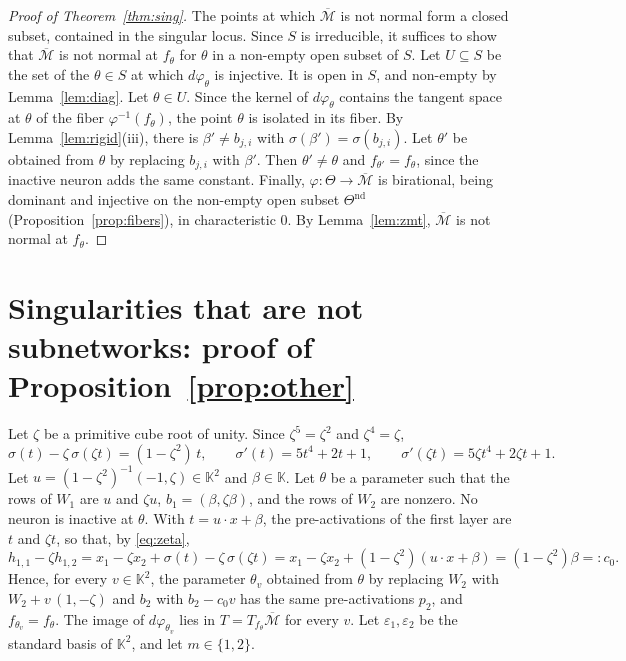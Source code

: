 \documentclass[11pt]{article}
\theoremstyle{definition}
\theoremstyle{remark}
\newcommand{\K}{\mathbb{K}}
\newcommand{\M}{\mathcal{M}}
\newcommand{\Mbar}{\overline{\M}}
\newcommand{\Tn}{\Theta^{\mathrm{nd}}}
\begin{document}
\begin{proof}[Proof of Theorem~\ref{thm:sing}]
The points at which $\Mbar$ is not normal form a closed subset, contained in the singular locus. Since $S$ is irreducible, it suffices to show that $\Mbar$ is not normal at $f_\theta$ for $\theta$ in a non-empty open subset of $S$. Let $U\subseteq S$ be the set of the $\theta\in S$ at which $d\varphi_\theta$ is injective. It is open in $S$, and non-empty by Lemma~\ref{lem:diag}. Let $\theta\in U$. Since the kernel of $d\varphi_\theta$ contains the tangent space at $\theta$ of the fiber $\varphi^{-1}(f_\theta)$, the point $\theta$ is isolated in its fiber. By Lemma~\ref{lem:rigid}(iii), there is $\beta'\ne b_{j,i}$ with $\sigma(\beta')=\sigma(b_{j,i})$. Let $\theta'$ be obtained from $\theta$ by replacing $b_{j,i}$ with $\beta'$. Then $\theta'\ne\theta$ and $f_{\theta'}=f_\theta$, since the inactive neuron adds the same constant. Finally, $\varphi\colon\Theta\to\Mbar$ is birational, being dominant and injective on the non-empty open subset $\Tn$ (Proposition~\ref{prop:fibers}), in characteristic $0$. By Lemma~\ref{lem:zmt}, $\Mbar$ is not normal at $f_\theta$.
\end{proof}

\section{Singularities that are not subnetworks: proof of Proposition~\ref{prop:other}}

Let $\zeta$ be a primitive cube root of unity. Since $\zeta^5=\zeta^2$ and $\zeta^4=\zeta$,
\begin{equation}\label{eq:zeta}
\sigma(t)-\zeta\,\sigma(\zeta t)=(1-\zeta^2)\,t,\qquad\sigma'(t)=5t^4+2t+1,\qquad\sigma'(\zeta t)=5\zeta t^4+2\zeta t+1.
\end{equation}
Let $u=(1-\zeta^2)^{-1}(-1,\zeta)\in\K^2$ and $\beta\in\K$. Let $\theta$ be a parameter such that the rows of $W_1$ are $u$ and $\zeta u$, $b_1=(\beta,\zeta\beta)$, and the rows of $W_2$ are nonzero. No neuron is inactive at $\theta$. With $t=u\cdot x+\beta$, the pre-activations of the first layer are $t$ and $\zeta t$, so that, by \eqref{eq:zeta},
\[
h_{1,1}-\zeta h_{1,2}=x_1-\zeta x_2+\sigma(t)-\zeta\,\sigma(\zeta t)=x_1-\zeta x_2+(1-\zeta^2)(u\cdot x+\beta)=(1-\zeta^2)\beta=:c_0.
\]
Hence, for every $v\in\K^2$, the parameter $\theta_v$ obtained from $\theta$ by replacing $W_2$ with $W_2+v\,(1,-\zeta)$ and $b_2$ with $b_2-c_0v$ has the same pre-activations $p_2$, and $f_{\theta_v}=f_\theta$. The image of $d\varphi_{\theta_v}$ lies in $T=T_{f_\theta}\Mbar$ for every $v$. Let $\varepsilon_1,\varepsilon_2$ be the standard basis of $\K^2$, and let $m\in\{1,2\}$.
\end{document}
